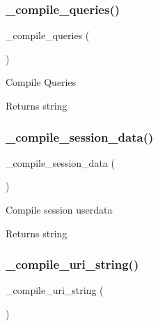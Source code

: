 \subsubsection{\texorpdfstring{\+\_\+compile\+\_\+queries()}{\_compile\_queries()}}
{\footnotesize\ttfamily \+\_\+compile\+\_\+queries (\begin{DoxyParamCaption}{ }\end{DoxyParamCaption})\hspace{0.3cm}{\ttfamily [protected]}}

Compile Queries

\begin{DoxyReturn}{Returns}
string 
\end{DoxyReturn}
\mbox{\label{class_c_i___profiler_a65f7d92ff03632e35cd506dd500a2dd7}} 
\subsubsection{\texorpdfstring{\+\_\+compile\+\_\+session\+\_\+data()}{\_compile\_session\_data()}}
{\footnotesize\ttfamily \+\_\+compile\+\_\+session\+\_\+data (\begin{DoxyParamCaption}{ }\end{DoxyParamCaption})\hspace{0.3cm}{\ttfamily [protected]}}

Compile session userdata

\begin{DoxyReturn}{Returns}
string 
\end{DoxyReturn}
\mbox{\label{class_c_i___profiler_a781803c49bf0c92d47187c76ebb42a1b}} 
\subsubsection{\texorpdfstring{\+\_\+compile\+\_\+uri\+\_\+string()}{\_compile\_uri\_string()}}
{\footnotesize\ttfamily \+\_\+compile\+\_\+uri\+\_\+string (\begin{DoxyParamCaption}{ }\end{DoxyParamCaption})\hspace{0.3cm}{\ttfamily [protected]}}

